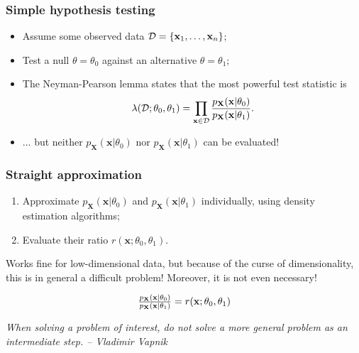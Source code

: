 \documentclass{beamer}
\newcommand{\mathnode}[2]{%
  \mathord{\tikz[baseline=(#1.base), inner sep = 0pt]{\node (#1) {$#2$};}}}
\begin{document}
\begin{frame}
    \frametitle{Simple hypothesis testing}

    \begin{itemize}
        \item Assume some observed data ${\cal D} = \{ \mathbf{x}_1, \dots, \mathbf{x}_n \}$;
        \item Test a null $\theta = \theta_0$ against an alternative $\theta = \theta_1$;
        \item The Neyman-Pearson lemma states that the most powerful test statistic is
            $$
            \lambda({\cal D}; \theta_0, \theta_1) = \prod_{\mathbf{x} \in {\cal D}} \frac{ p_\mathbf{X}(\mathbf{x}|\theta_0)}{ p_\mathbf{X}(\mathbf{x}|\theta_1)}.
            $$
        \item ... but neither $p_\mathbf{X}(\mathbf{x}|\theta_0)$ nor $p_\mathbf{X}(\mathbf{x}|\theta_1)$ can be evaluated!

    \end{itemize}

\end{frame}

\begin{frame}[fragile]
    \frametitle{Straight approximation}

    \begin{enumerate}
        \item Approximate $p_\mathbf{X}(\mathbf{x}|\theta_0)$ and $p_\mathbf{X}(\mathbf{x}|\theta_1)$ individually, using density estimation algorithms;
        \item Evaluate their ratio $r(\mathbf{x};\theta_0,\theta_1)$.
    \end{enumerate}

    \vspace{1em}

    Works fine for low-dimensional data, but because of the curse of dimensionality, this is in general a difficult problem! Moreover, {\color{red} it is not even necessary}!

    $$
      \mathnode{A}{  \frac{ p_\mathbf{X}(\mathbf{x}|\theta_0)}{ p_\mathbf{X}(\mathbf{x}|\theta_1)} } = \mathnode{B}{ r(\mathbf{x};\theta_0,\theta_1)}
    $$


    \vspace{1em}

    {\small \centering \it When solving a problem of interest, do not solve a more general problem as an intermediate step. -- Vladimir Vapnik}

\end{frame}
\end{document}
